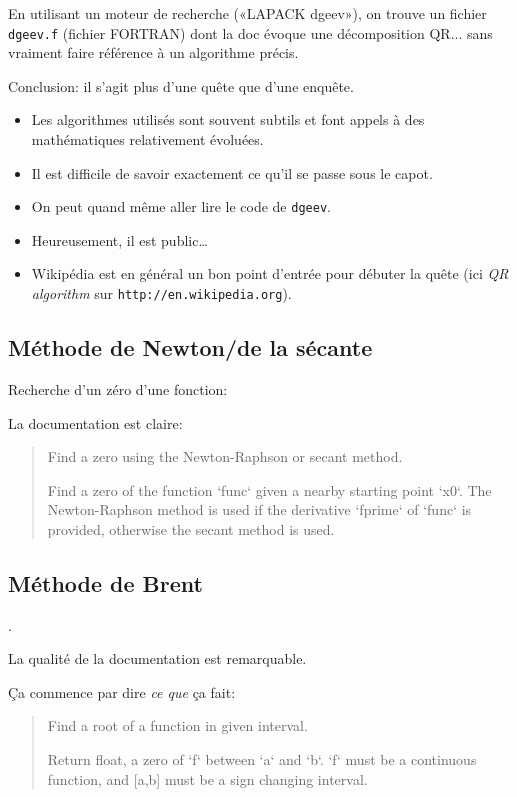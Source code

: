En utilisant  un moteur  de recherche («LAPACK  dgeev»), on  trouve un
fichier  \texttt{dgeev.f} (fichier  FORTRAN)  dont la  doc évoque  une
décomposition  QR... sans  vraiment  faire référence  à un  algorithme
précis.
\bigskip

Conclusion: il s'agit plus d'une quête que d'une enquête.
\begin{itemize}
\item Les algorithmes utilisés sont souvent subtils et font appels à
  des mathématiques relativement évoluées.
\item Il est difficile de  savoir exactement ce qu'il se  passe sous le
capot.
\item On peut quand même aller lire le code de \texttt{dgeev}.
\item Heureusement, il est public\ldots{} 
\item Wikipédia est  en général un bon point  d'entrée pour débuter la
  quête (ici \emph{QR algorithm} sur \texttt{http://en.wikipedia.org}).
\end{itemize}

\subsection{Méthode de Newton/de la sécante}
Recherche d'un zéro d'une fonction:


La documentation est claire:
\begin{quote}
  Find a zero using the Newton-Raphson or secant method.

  Find a zero of the function `func` given a nearby starting point `x0`.
  The Newton-Raphson method is used if the derivative `fprime` of `func`
  is provided, otherwise the secant method is used.
\end{quote}

\subsection{Méthode de Brent}

.

La qualité de la documentation est remarquable.

Ça commence par dire \emph{ce que} ça fait:

\begin{quote}
Find a root of a function in given interval.

Return float, a zero of `f` between `a` and `b`.  `f` must be a continuous
function, and [a,b] must be a sign changing interval.
\end{quote}

